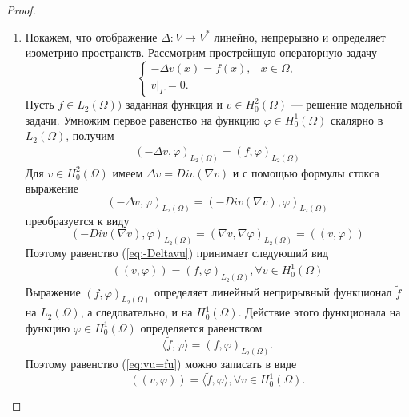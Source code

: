 \begin{proof} ~\\
    \begin{enumerate} 
        \item Покажем, что отображение $\Delta: V \rightarrow V^\ast$ линейно, непрерывно и определяет изометрию пространств.
        Рассмотрим прострейшую операторную задачу 
        $$
        \begin{cases}
            -\Delta v(x)=f(x), & x\in\Omega,\\
            v|_{\Gamma}=0.
        \end{cases}
        $$
        Пусть $f\in L_2(\Omega))$ заданная функция и $v\in H_0^2(\Omega)$ --- решение модельной задачи. Умножим первое равенство на функцию $\varphi \in H_0^1(\Omega)$ 
        скалярно в $L_2(\Omega)$, получим
        \begin{equation}\label{eq:-Deltavu}
            \begin{gathered}
                (-\Delta v,\varphi)_{L_2(\Omega)}=(f,\varphi)_{L_2(\Omega)}
            \end{gathered}
        \end{equation}
        Для $v\in H_0^2(\Omega)$ имеем $\Delta v= Div (\nabla v)$ и с помощью формулы стокса выражение $$(-\Delta v,\varphi)_{L_2(\Omega)}=(-Div (\nabla v),\varphi)_{L_2(\Omega)}$$ преобразуется к виду
        $$(-Div (\nabla v),\varphi)_{L_2(\Omega)}=(\nabla v,\nabla \varphi)_{L_2(\Omega)}=((v,\varphi))$$
        Поэтому равенство (\ref{eq:-Deltavu}) принимает следующий вид
        \begin{equation}\label{eq:vu=fu}
            \begin{gathered}
                ((v,\varphi))=(f,\varphi)_{L_2(\Omega)}, \forall v\in H_0^1(\Omega)
            \end{gathered}
        \end{equation}
        Выражение $(f,\varphi)_{L_2(\Omega)}$ определяет линейный неприрывный функционал $\tilde f$ на $L_2(\Omega)$, а следовательно, и на $H_0^1(\Omega).$
        Действие этого функционала на функцию $\varphi\in H_0^1(\Omega)$ определяется равенством $$\langle\tilde f,\varphi \rangle = (f,\varphi)_{L_2(\Omega)}.$$
        Поэтому равенство (\ref{eq:vu=fu}) можно записать в виде $$((v,\varphi))=\langle\tilde f,\varphi \rangle, \forall v\in H_0^1(\Omega).$$


\end{enumerate}
\end{proof}
